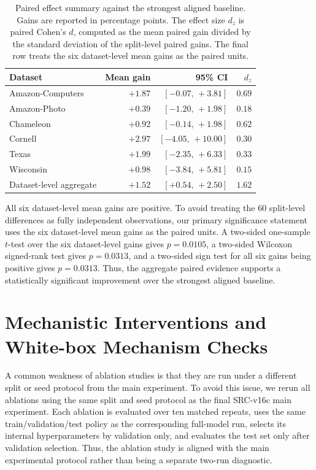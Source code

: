 \begin{table}[t]
\centering
\footnotesize
\caption{
Paired effect summary against the strongest aligned baseline. Gains are
reported in percentage points. The effect size $d_z$ is paired Cohen's $d$,
computed as the mean paired gain divided by the standard deviation of the
split-level paired gains. The final row treats the six dataset-level mean
gains as the paired units.
}
\label{tab:paired-effect}
\begin{tabular}{lrrr}
\toprule
Dataset & Mean gain & 95\% CI & $d_z$ \\
\midrule
Amazon-Computers & $+1.87$ & $[-0.07,\,+3.81]$ & $0.69$ \\
Amazon-Photo     & $+0.39$ & $[-1.20,\,+1.98]$ & $0.18$ \\
Chameleon        & $+0.92$ & $[-0.14,\,+1.98]$ & $0.62$ \\
Cornell          & $+2.97$ & $[-4.05,\,+10.00]$ & $0.30$ \\
Texas            & $+1.99$ & $[-2.35,\,+6.33]$ & $0.33$ \\
Wisconsin        & $+0.98$ & $[-3.84,\,+5.81]$ & $0.15$ \\
\midrule
Dataset-level aggregate & $+1.52$ & $[+0.54,\,+2.50]$ & $1.62$ \\
\bottomrule
\end{tabular}
\end{table}

All six dataset-level mean gains are positive. To avoid treating the 60
split-level differences as fully independent observations, our primary
significance statement uses the six dataset-level mean gains as the paired
units. A two-sided one-sample $t$-test over the six dataset-level gains gives
$p=0.0105$, a two-sided Wilcoxon signed-rank test gives $p=0.0313$, and a
two-sided sign test for all six gains being positive gives $p=0.0313$. Thus,
the aggregate paired evidence supports a statistically significant improvement
over the strongest aligned baseline. 



\section{Mechanistic Interventions and White-box Mechanism Checks}
\label{sec:ablation-specialization}

A common weakness of ablation studies is that they are run under a different
split or seed protocol from the main experiment. To avoid this issue, we rerun
all ablations using the same split and seed protocol as the final SRC-v16c
main experiment. Each ablation is evaluated over ten matched repeats, uses the
same train/validation/test policy as the corresponding full-model run, selects
its internal hyperparameters by validation only, and evaluates the test set
only after validation selection. Thus, the ablation study is aligned with the
main experimental protocol rather than being a separate two-run diagnostic.

